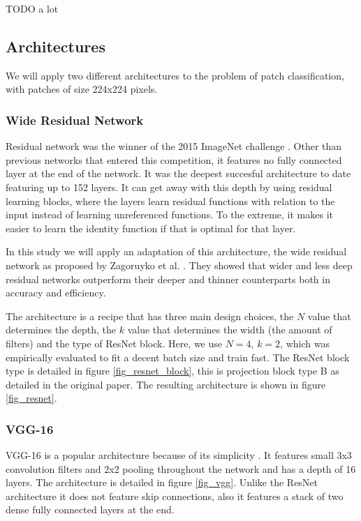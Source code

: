 \documentclass[journal]{IEEEtran}
\begin{document}
TODO a lot
\subsection{Architectures}

We will apply two different architectures to the problem of patch classification, with patches of size 224x224 pixels.


\subsubsection{Wide Residual Network}
Residual network was the winner of the 2015 ImageNet challenge \cite{resnet}. Other than previous networks that entered this competition, it features no fully connected layer at the end of the network. It was the deepest succesful architecture to date featuring up to 152 layers. It can get away with this depth by using residual learning blocks, where the layers learn residual functions with relation to the input instead of learning unreferenced functions. To the extreme, it makes it easier to learn the identity function if that is optimal for that layer.

In this study we will apply an adaptation of this architecture, the wide residual network as proposed by Zagoruyko et al. \cite{wideresnet}. They showed that wider and less deep residual networks outperform their deeper and thinner counterparts both in accuracy and efficiency. 

The architecture is a recipe that has three main design choices, the $N$ value that determines the depth, the $k$ value that determines the width (the amount of filters) and the type of ResNet block. Here, we use $N=4$, $k=2$, which was empirically evaluated to fit a decent batch size and train fast. The ResNet block type is detailed in figure \ref{fig_resnet_block}, this is projection block type B as detailed in the original paper. The resulting architecture is shown in figure \ref{fig_resnet}.

\subsubsection{VGG-16}
VGG-16 is a popular architecture because of its simplicity \cite{vgg}. It features small 3x3 convolution filters and 2x2 pooling throughout the network and has a depth of 16 layers. The architecture is detailed in figure \ref{fig_vgg}. Unlike the ResNet architecture it does not feature skip connections, also it features a stack of two dense fully connected layers at the end.
\end{document}
